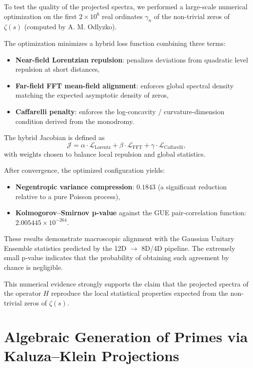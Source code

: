 \documentclass[11pt,a4paper]{article}
\begin{document}
To test the quality of the projected spectra, we performed a large-scale numerical optimization on the first \(2 \times 10^6\) real ordinates \(\gamma_n\) of the non-trivial zeros of \(\zeta(s)\) (computed by A. M. Odlyzko).

The optimization minimizes a hybrid loss function combining three terms:
\begin{itemize}
    \item \textbf{Near-field Lorentzian repulsion}: penalizes deviations from quadratic level repulsion at short distances,
    \item \textbf{Far-field FFT mean-field alignment}: enforces global spectral density matching the expected asymptotic density of zeros,
    \item \textbf{Caffarelli penalty}: enforces the log-concavity / curvature-dimension condition derived from the monodromy.
\end{itemize}

The hybrid Jacobian is defined as
\[
\mathcal{J} = \alpha \cdot \mathcal{L}_{\text{Lorentz}} + \beta \cdot \mathcal{L}_{\text{FFT}} + \gamma \cdot \mathcal{L}_{\text{Caffarelli}},
\]
with weights chosen to balance local repulsion and global statistics.

After convergence, the optimized configuration yields:
\begin{itemize}
    \item \textbf{Negentropic variance compression}: \(0.1843\) (a significant reduction relative to a pure Poisson process),
    \item \textbf{Kolmogorov--Smirnov p-value} against the GUE pair-correlation function: \(2.005445 \times 10^{-264}\).
\end{itemize}

These results demonstrate macroscopic alignment with the Gaussian Unitary Ensemble statistics predicted by the 12D \(\to\) 8D/4D pipeline. The extremely small p-value indicates that the probability of obtaining such agreement by chance is negligible.

This numerical evidence strongly supports the claim that the projected spectra of the operator \(H\) reproduce the local statistical properties expected from the non-trivial zeros of \(\zeta(s)\).

\section{Algebraic Generation of Primes via Kaluza--Klein Projections}
\end{document}
